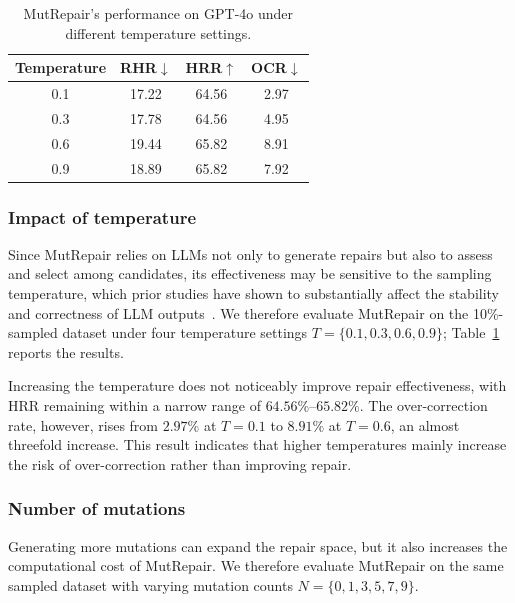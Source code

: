 \documentclass[acmsmall,screen,review,anonymous]{acmart}
\begin{document}
\begin{table}[!htbp]
  \centering
  \footnotesize
  \setlength{\tabcolsep}{8pt}
  \caption{MutRepair's performance on GPT-4o under different temperature settings.}
  \begin{tabular}{c | ccc}
    \toprule
    Temperature & RHR$\downarrow$ & HRR$\uparrow$ & OCR$\downarrow$ \\
    \midrule
    0.1   & 17.22 & 64.56 & 2.97 \\
    0.3   & 17.78 & 64.56 & 4.95 \\
    0.6   & 19.44 & 65.82 & 8.91 \\
    0.9   & 18.89 & 65.82 & 7.92 \\
    \bottomrule
  \end{tabular}
  \label{tab:rq3.2}
\end{table}

\subsubsection{Impact of temperature}
Since MutRepair relies on LLMs not only to generate repairs but also to assess and select among candidates, its effectiveness may be sensitive to the sampling temperature, which prior studies have shown to substantially affect the stability and correctness of LLM outputs~\cite{arora2024optimizing, renze2024effect}. We therefore evaluate MutRepair on the 10\%-sampled dataset under four temperature settings $T=\{0.1, 0.3, 0.6, 0.9\}$; Table~\ref{tab:rq3.2} reports the results.

Increasing the temperature does not noticeably improve repair effectiveness, with HRR remaining within a narrow range of $64.56\%\text{--}65.82\%$. The over-correction rate, however, rises from $2.97\%$ at $T{=}0.1$ to $8.91\%$ at $T{=}0.6$, an almost threefold increase. This result indicates that higher temperatures mainly increase the risk of over-correction rather than improving repair.

\subsubsection{Number of mutations}
Generating more mutations can expand the repair space, but it also increases the computational cost of MutRepair. We therefore evaluate MutRepair on the same sampled dataset with varying mutation counts $N=\{0,1,3,5,7,9\}$.
\end{document}
